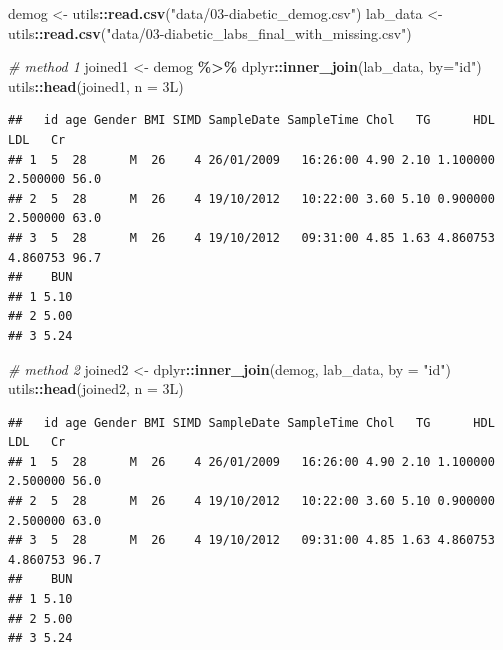 \documentclass[
]{book}
\newenvironment{Shaded}{\begin{snugshade}}{\end{snugshade}}
\newcommand{\AttributeTok}[1]{\textcolor[rgb]{0.13,0.29,0.53}{#1}}
\newcommand{\CommentTok}[1]{\textcolor[rgb]{0.56,0.35,0.01}{\textit{#1}}}
\newcommand{\DataTypeTok}[1]{\textcolor[rgb]{0.13,0.29,0.53}{#1}}
\newcommand{\DecValTok}[1]{\textcolor[rgb]{0.00,0.00,0.81}{#1}}
\newcommand{\FunctionTok}[1]{\textcolor[rgb]{0.13,0.29,0.53}{\textbf{#1}}}
\newcommand{\NormalTok}[1]{#1}
\newcommand{\OtherTok}[1]{\textcolor[rgb]{0.56,0.35,0.01}{#1}}
\newcommand{\SpecialCharTok}[1]{\textcolor[rgb]{0.81,0.36,0.00}{\textbf{#1}}}
\newcommand{\StringTok}[1]{\textcolor[rgb]{0.31,0.60,0.02}{#1}}
\begin{document}
\begin{Shaded}
\begin{Highlighting}[]
\NormalTok{demog }\OtherTok{\textless{}{-}}\NormalTok{ utils}\SpecialCharTok{::}\FunctionTok{read.csv}\NormalTok{(}\StringTok{"data/03{-}diabetic\_demog.csv"}\NormalTok{)}
\NormalTok{lab\_data }\OtherTok{\textless{}{-}}\NormalTok{ utils}\SpecialCharTok{::}\FunctionTok{read.csv}\NormalTok{(}\StringTok{"data/03{-}diabetic\_labs\_final\_with\_missing.csv"}\NormalTok{)}

\CommentTok{\# method 1}
\NormalTok{joined1 }\OtherTok{\textless{}{-}}\NormalTok{ demog }\SpecialCharTok{\%\textgreater{}\%}\NormalTok{ dplyr}\SpecialCharTok{::}\FunctionTok{inner\_join}\NormalTok{(lab\_data, }\AttributeTok{by=}\StringTok{"id"}\NormalTok{)}
\NormalTok{utils}\SpecialCharTok{::}\FunctionTok{head}\NormalTok{(joined1, }\AttributeTok{n =} \DecValTok{3}\DataTypeTok{L}\NormalTok{)}
\end{Highlighting}
\end{Shaded}

\begin{verbatim}
##   id age Gender BMI SIMD SampleDate SampleTime Chol   TG      HDL      LDL   Cr
## 1  5  28      M  26    4 26/01/2009   16:26:00 4.90 2.10 1.100000 2.500000 56.0
## 2  5  28      M  26    4 19/10/2012   10:22:00 3.60 5.10 0.900000 2.500000 63.0
## 3  5  28      M  26    4 19/10/2012   09:31:00 4.85 1.63 4.860753 4.860753 96.7
##    BUN
## 1 5.10
## 2 5.00
## 3 5.24
\end{verbatim}

\begin{Shaded}
\begin{Highlighting}[]
\CommentTok{\# method 2}
\NormalTok{joined2 }\OtherTok{\textless{}{-}}\NormalTok{ dplyr}\SpecialCharTok{::}\FunctionTok{inner\_join}\NormalTok{(demog, lab\_data, }\AttributeTok{by =} \StringTok{"id"}\NormalTok{)}
\NormalTok{utils}\SpecialCharTok{::}\FunctionTok{head}\NormalTok{(joined2, }\AttributeTok{n =} \DecValTok{3}\DataTypeTok{L}\NormalTok{)}
\end{Highlighting}
\end{Shaded}

\begin{verbatim}
##   id age Gender BMI SIMD SampleDate SampleTime Chol   TG      HDL      LDL   Cr
## 1  5  28      M  26    4 26/01/2009   16:26:00 4.90 2.10 1.100000 2.500000 56.0
## 2  5  28      M  26    4 19/10/2012   10:22:00 3.60 5.10 0.900000 2.500000 63.0
## 3  5  28      M  26    4 19/10/2012   09:31:00 4.85 1.63 4.860753 4.860753 96.7
##    BUN
## 1 5.10
## 2 5.00
## 3 5.24
\end{verbatim}
\end{document}
